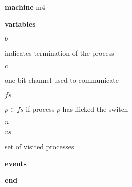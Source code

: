 \begin{block}
  \item   \textbf{machine} m4
  \item   \textbf{variables}
  \begin{block}
    \item   $b$
    \item   \begin{block}
      \item    indicates termination of the process 
    \end{block}
    \item   $c$
    \item   \begin{block}
      \item    one-bit channel used to communicate 
    \end{block}
    \item   $fs$
    \item   \begin{block}
      \item    $p \in fs$ if process $p$ has flicked the switch 
    \end{block}
    \item   $n$
    \item   $vs$
    \item   \begin{block}
      \item   set of visited processes
    \end{block}
  \end{block}
  \item   \textbf{events}
  \begin{block}
    \item   
    \item   
    \item   
    \item   
  \end{block}
  \item   \textbf{end} \\
\end{block}
